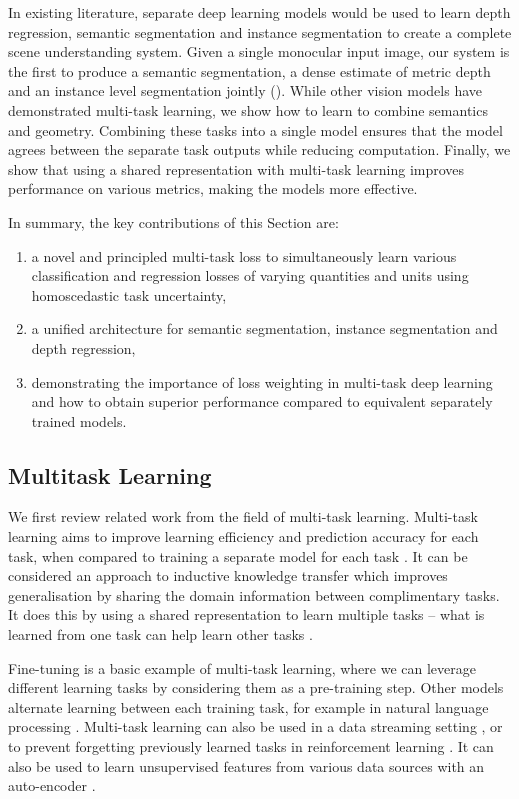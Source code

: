 In existing literature, separate deep learning models would be used to learn depth regression, semantic segmentation and instance segmentation to create a complete scene understanding system. Given a single monocular input image, our system is the first to produce a semantic segmentation, a dense estimate of metric depth and an instance level segmentation jointly (). While other vision models have demonstrated multi-task learning, we show how to learn to combine semantics and geometry. Combining these tasks into a single model ensures that the model agrees between the separate task outputs while reducing computation. Finally, we show that using a shared representation with multi-task learning improves performance on various metrics, making the models more effective.

In summary, the key contributions of this Section are:
\begin{enumerate}
\item a novel and principled multi-task loss to simultaneously learn various classification and regression losses of varying quantities and units using homoscedastic task uncertainty,
\item a unified architecture for semantic segmentation, instance segmentation and depth regression,
\item demonstrating the importance of loss weighting in multi-task deep learning and how to obtain superior performance compared to equivalent separately trained models.
\end{enumerate}



\subsection{Multitask Learning}

We first review related work from the field of multi-task learning. Multi-task learning aims to improve learning efficiency and prediction accuracy for each task, when compared to training a separate model for each task \cite{thrun1996learning,baxter2000model}. It can be considered an approach to inductive knowledge transfer which improves generalisation by sharing the domain information between complimentary tasks. It does this by using a shared representation to learn multiple tasks -- what is learned from one task can help learn other tasks \cite{caruana1998multitask}.

Fine-tuning \cite{agrawal2015learning,oquab2014learning} is a basic example of multi-task learning, where we can leverage different learning tasks by considering them as a pre-training step.
Other models alternate learning between each training task, for example in natural language processing \cite{collobert2008unified}.
Multi-task learning can also be used in a data streaming setting \cite{thrun1996learning}, or to prevent forgetting previously learned tasks in reinforcement learning \cite{kirkpatrick2017overcoming}. It can also be used to learn unsupervised features from various data sources with an auto-encoder \cite{ngiam2011multimodal}.

